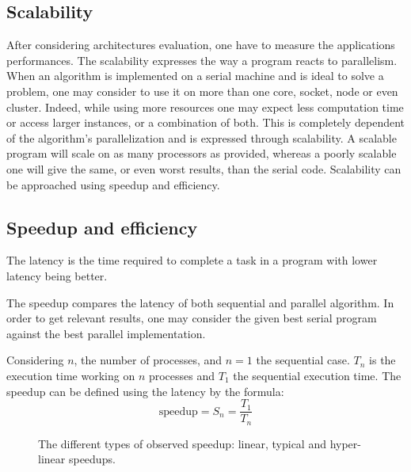 \subsection{Scalability}

After considering architectures evaluation, one have to measure the applications performances.
The scalability expresses the way a program reacts to parallelism. 
When an algorithm is implemented on a serial machine and is ideal to solve a problem, one may consider to use it on more than one core, socket, node or even cluster. 
Indeed, while using more resources one may expect less computation time or access larger instances, or a combination of both. 
This is completely dependent of the algorithm's parallelization and is expressed through scalability. 
A scalable program will scale on as many processors as provided, whereas a poorly scalable one will give the same, or even worst results, than the serial code.  
Scalability can be approached using speedup and efficiency.

\subsection{Speedup and efficiency}
The latency is the time required to complete a task in a program with lower latency being better. 

The speedup compares the latency of both sequential and parallel algorithm. 
In order to get relevant results, one may consider the given best serial program against the best parallel implementation.

Considering $n$, the number of processes, and $n=1$ the sequential case.
$T_n$ is the execution time working on $n$ processes and $T_1$ the sequential execution time. 
The speedup can be defined using the latency by the formula: 
\begin{equation}
\text{speedup} = S_n =  \frac{T_1}{T_n}
\end{equation}

\begin{figure}
\centering 
{}
\caption[Representation of typical speedups]{The different types of observed speedup: linear, typical and hyper-linear speedups.}
\label{fig:1_HPC:speedup_obs}
\end{figure}


